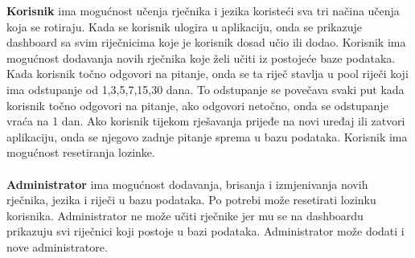 		\textbf{Korisnik} ima mogućnost učenja rječnika i jezika koristeći sva tri načina učenja koja se rotiraju.
		Kada se korisnik ulogira u aplikaciju, onda se prikazuje dashboard sa svim riječnicima koje je korisnik dosad učio ili dodao.
		Korisnik ima mogućnost dodavanja novih rječnika koje želi učiti iz postojeće baze podataka.
		Kada korisnik točno odgovori na pitanje, onda se ta riječ stavlja u pool riječi koji ima odstupanje od 1,3,5,7,15,30 dana.
		To odstupanje se povečava svaki put kada korisnik točno odgovori na pitanje, ako odgovori netočno, onda se odstupanje vraća na 1 dan.
		Ako korisnik tijekom rješavanja prijeđe na novi uređaj ili zatvori aplikaciju, onda se njegovo zadnje pitanje sprema u bazu podataka.
		Korisnik ima mogućnost resetiranja lozinke.
		\\
		\\
		\textbf{Administrator} ima mogućnost dodavanja, brisanja i izmjenivanja novih rječnika, jezika i riječi u bazu podataka.
		Po potrebi može resetirati lozinku korisnika.
		Administrator ne može učiti rječnike jer mu se na dashboardu prikazuju svi riječnici koji postoje u bazi podataka.
		Administrator može dodati i nove administratore.
		\\
		\\

		\eject
		
	